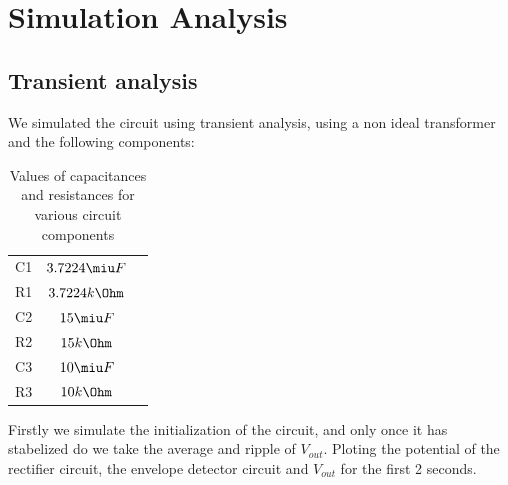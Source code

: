 \section{Simulation Analysis}
\label{sec:simulation}

\subsection{Transient analysis}

We simulated the circuit using transient analysis, using a non ideal transformer and the following components:

\begin{table}[H]
\addtolength{\tabcolsep}{-4pt}
\caption{Values of capacitances and resistances for various circuit components}
\vspace{-3mm}
\begin{tabular}{|c|c|c|}
\hline
C1 & $3.7224\miu F$ \\
R1 & $3.7224k\Ohm$ \\
C2 & $15\miu F$ \\
R2 & $15k\Ohm$ \\
C3 & $10\miu F$ \\
R3 & $10k\Ohm$ \\
\hline
\end{tabular}
\label{tab:Components}
\end{table}

\par

Firstly we simulate the initialization of the circuit, and only once it has stabelized do we take the average and ripple of $V_{out}$. Ploting the potential of the rectifier circuit, the envelope detector circuit and $V_{out}$ for the first 2 seconds.

